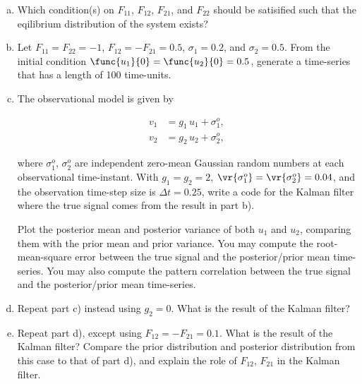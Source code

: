 \begin{enumerate}[a)]
	\item Which condition(s) on $F_{11}$, $F_{12}$, $F_{21}$, and $F_{22}$ should be satisified such that the eqilibrium distribution of the system exists?
	
	\item Let $F_{11} = F_{22} = -1$, $F_{12} = -F_{21} = 0.5$, $\sigma_1 = 0.2$, and $\sigma_2 = 0.5$. From the initial condition $\func{u_1}{0} = \func{u_2}{0} = 0.5$, generate a time-series that has a length of 100 time-units.
	
	\item The observational model is given by
	
	\begin{subequations}
		\begin{align}
			v_1 &= g_1\,u_1 + \sigma_1^{o}, \\
			v_2 &= g_2\,u_2 + \sigma_2^{o},
		\end{align}
	\end{subequations}
	
	where $\sigma_1^{o}$, $\sigma_2^{o}$ are independent zero-mean Gaussian random numbers at each observational time-instant. With $g_1 = g_2 = 2$, $\vr{\sigma_1^{o}} = \vr{\sigma_2^{o}} = 0.04$, and the observation time-step size is $\Delta t = 0.25$, write a code for the Kalman filter where the true signal comes from the result in part b).
	
	Plot the posterior mean and posterior variance of both $u_1$ and $u_2$, comparing them with the prior mean and prior variance. You may compute the root-mean-square error between the true signal and the posterior/prior mean time-series. You may also compute the pattern correlation between the true signal and the posterior/prior mean time-series.
	
	\item Repeat part c) instead using $g_2 = 0$. What is the result of the Kalman filter?
	
	\item Repeat part d), except using $F_{12} = -F_{21} = 0.1$. What is the result of the Kalman filter? Compare the prior distribution and posterior distribution from this case to that of part d), and explain the role of $F_{12}$, $F_{21}$ in the Kalman filter.
\end{enumerate}

